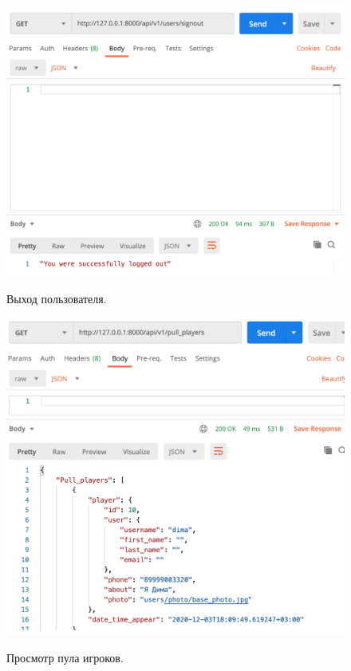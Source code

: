 \documentclass[a4paper,14pt]{extarticle}
\begin{document}
 	\begin{figure}[h!]
 		\begin{center}
 			{\includegraphics[scale = 0.5]{img/logout.png}}
 			\label{ris:logout}
 		\end{center}
 		\caption{Выход пользователя.}
 	\end{figure}
 
 	\newpage
 
 	\begin{figure}[h!]
 		\begin{center}
 			{\includegraphics[scale = 0.5]{img/pull2.png}}
 			\label{ris:pull}
 		\end{center}
 		\caption{Просмотр пула игроков.}
 	\end{figure}
 
\end{document}
